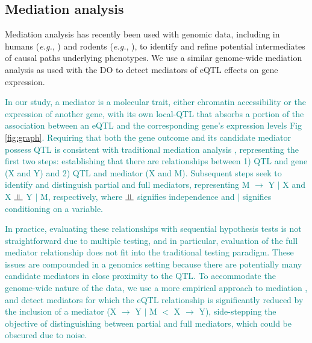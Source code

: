 \documentclass[10pt,letterpaper]{article}
\newcommand{\indep}{\rotatebox[origin=c]{90}{$\models$}}
\newcommand{\eg}{\emph{e.g.}\xspace}
\newcommand{\GKinline}[1]{\textcolor{teal}{#1}}
\begin{document}
\subsection*{Mediation analysis}

Mediation analysis has recently been used with genomic data, including in humans (\eg, \cite{Battle2014}) and rodents (\eg, \cite{Keele2018,Oreper2018}), to identify and refine potential intermediates of causal paths underlying phenotypes. We use a similar genome-wide mediation analysis as used with the DO \cite{Chick2016, Keller2018} to detect mediators of eQTL effects on gene expression.

\GKinline{In our study, a mediator is a molecular trait, either chromatin accessibility or the expression of another gene, with its own local-QTL that absorbs a portion of the association between an eQTL and the corresponding gene's expression levels Fig \ref{fig:graph}. Requiring that both the gene outcome and its candidate mediator possess QTL is consistent with traditional mediation analysis \cite{Baron1986}, representing the first two steps: establishing that there are relationships between 1) QTL and gene (X and Y) and 2) QTL and mediator (X and M). Subsequent steps seek to identify and distinguish partial and full mediators, representing M $\rightarrow$ Y $|$ X and X $\indep$ Y $|$ M, respectively, where $\indep$ signifies independence and $|$ signifies conditioning on a variable.}

\GKinline{In practice, evaluating these relationships with sequential hypothesis tests is not straightforward due to multiple testing, and in particular, evaluation of the full mediator relationship does not fit into the traditional testing paradigm. These issues are compounded in a genomics setting because there are potentially many candidate mediators in close proximity to the QTL. To accommodate the genome-wide nature of the data, we use a more empirical approach to mediation \cite{Chick2016,Keller2018,Skelly2019}, and detect mediators for which the eQTL relationship is significantly reduced by the inclusion of a mediator (X $\rightarrow$ Y $|$ M $<$ X $\rightarrow$ Y), side-stepping the objective of distinguishing between partial and full mediators, which could be obscured due to noise.}
\end{document}
